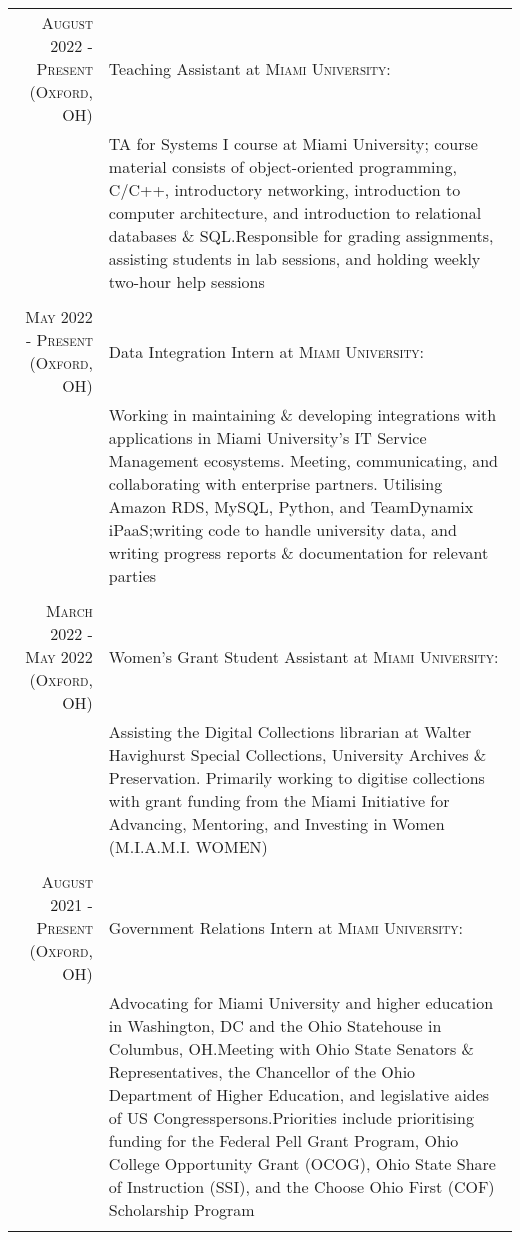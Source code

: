 \documentclass[letterpaper,8pt]{article} %
\begin{document}
\footnotesize{\begin{tabular}{r|p{12cm}}
\footnotesize{\textsc{August 2022 - Present (Oxford, OH)}} & \footnotesize{Teaching Assistant at \textsc{Miami University}}:\\
& \footnotesize{TA for Systems I course at Miami University; course material consists of object-oriented programming, C/C++, introductory networking, introduction to computer architecture, and introduction to relational databases \& SQL.\@ Responsible for grading assignments, assisting students in lab sessions, and holding weekly two-hour help sessions}\\
\multicolumn{2}{c}{} \\


\footnotesize{\textsc{May 2022 - Present (Oxford, OH)}} & \footnotesize{Data Integration Intern at \textsc{Miami University}}:\\
& \footnotesize{Working in maintaining \& developing integrations with applications in Miami University's IT Service Management ecosystems. Meeting, communicating, and collaborating with enterprise partners. Utilising Amazon RDS, MySQL, Python, and TeamDynamix iPaaS;\@ writing code to handle university data, and writing progress reports \& documentation for relevant parties}\\
\multicolumn{2}{c}{} \\


\footnotesize{\textsc{March 2022 - May 2022 (Oxford, OH)}} & \footnotesize{Women's Grant Student Assistant at \textsc{Miami University}}:\\
& \footnotesize{Assisting the Digital Collections librarian at Walter Havighurst Special Collections, University Archives \& Preservation. Primarily working to digitise collections with grant funding from the Miami Initiative for Advancing, Mentoring, and Investing in Women (M.I.A.M.I. WOMEN)}\\
\multicolumn{2}{c}{} \\


\footnotesize{\textsc{August 2021 - Present (Oxford, OH)}} & \footnotesize{Government Relations Intern at \textsc{Miami University}}:\\
& \footnotesize{Advocating for Miami University and higher education in Washington, DC and the Ohio Statehouse in Columbus, OH.\@ Meeting with Ohio State Senators \& Representatives, the Chancellor of the Ohio Department of Higher Education, and legislative aides of US Congresspersons.\@ Priorities include prioritising funding for the Federal Pell Grant Program, Ohio College Opportunity Grant (OCOG), Ohio State Share of Instruction (SSI), and the Choose Ohio First (COF) Scholarship Program}\\
\multicolumn{2}{c}{} \\


\end{tabular}}\normalsize\\
\end{document}
